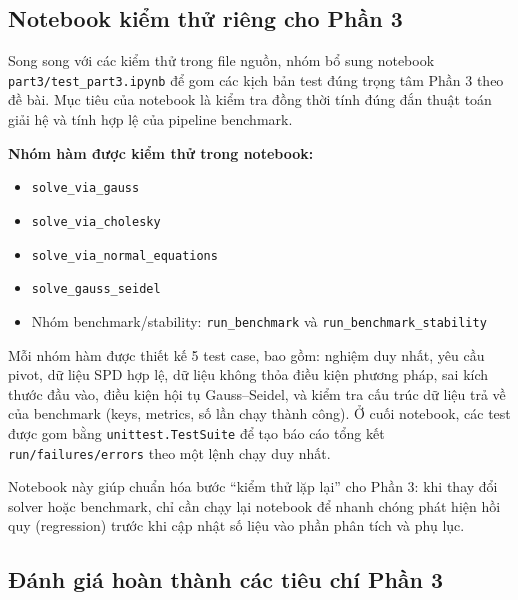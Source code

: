 \documentclass[a4paper]{article}
\begin{document}
\subsection{Notebook kiểm thử riêng cho Phần 3}

Song song với các kiểm thử trong file nguồn, nhóm bổ sung notebook \texttt{part3/test\_part3.ipynb} để gom các kịch bản test đúng trọng tâm Phần 3 theo đề bài. Mục tiêu của notebook là kiểm tra đồng thời tính đúng đắn thuật toán giải hệ và tính hợp lệ của pipeline benchmark.

\textbf{Nhóm hàm được kiểm thử trong notebook:}
\begin{itemize}
    \item \texttt{solve\_via\_gauss}
    \item \texttt{solve\_via\_cholesky}
    \item \texttt{solve\_via\_normal\_equations}
    \item \texttt{solve\_gauss\_seidel}
    \item Nhóm benchmark/stability: \texttt{run\_benchmark} và \texttt{run\_benchmark\_stability}
\end{itemize}

Mỗi nhóm hàm được thiết kế 5 test case, bao gồm: nghiệm duy nhất, yêu cầu pivot, dữ liệu SPD hợp lệ, dữ liệu không thỏa điều kiện phương pháp, sai kích thước đầu vào, điều kiện hội tụ Gauss--Seidel, và kiểm tra cấu trúc dữ liệu trả về của benchmark (keys, metrics, số lần chạy thành công). Ở cuối notebook, các test được gom bằng \texttt{unittest.TestSuite} để tạo báo cáo tổng kết \texttt{run/failures/errors} theo một lệnh chạy duy nhất.

Notebook này giúp chuẩn hóa bước ``kiểm thử lặp lại'' cho Phần 3: khi thay đổi solver hoặc benchmark, chỉ cần chạy lại notebook để nhanh chóng phát hiện hồi quy (regression) trước khi cập nhật số liệu vào phần phân tích và phụ lục.

\subsection{Đánh giá hoàn thành các tiêu chí Phần 3}
\end{document}
